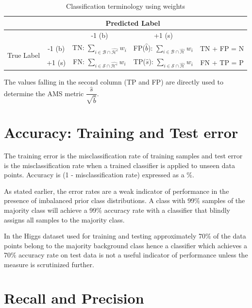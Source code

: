 \begin{table}[H]
\begin{center}
\begin{tabular}{c|c|c|c|c}
& & \multicolumn{2}{c}{Predicted Label}\\
\hline
& & -1 (b) & +1 (s) \\
\hline
\multirow{3}{*}{True Label} & -1 (b) & TN: $\sum_{i \in \mathcal{B} \cap \hat{\mathcal{H}^{c}}} w_{i}$  & FP($\hat{b}$): $\sum_{i \in \mathcal{B} \cap \hat{\mathcal{H}}} w_{i}$  & TN + FP = N\\ 
& +1 (s) & FN: $\sum_{i \in \mathcal{S} \cap \hat{\mathcal{H}^{c}}} w_{i}$ & TP($\hat{s}$): $\sum_{i \in \mathcal{S} \cap \hat{\mathcal{H}}} w_{i}$ & FN + TP = P\\ 
\hline 
\end{tabular}
\label{confusion_weights}
\caption{Classification terminology using weights}
\end{center}
\end{table}

The values falling in the second column (TP and FP) are directly used to determine the AMS metric $\dfrac{\hat{s}}{\sqrt{\hat{b}}}$.

\section{Accuracy: Training and Test error}

The training error is the misclassification rate of training samples and test error is the misclassification rate when a trained classifier is applied to unseen data points. Accuracy is (1 - misclassification rate) expressed as a $\%$.

As stated earlier, the error rates are a weak indicator of performance in the presence of imbalanced prior class distributions. A class with 99$\%$ samples of the majority class will achieve a 99$\%$ accuracy rate with a classifier that blindly assigns all samples to the majority class. 

In the Higgs dataset used for training and testing approximately 70$\%$ of the data points belong to the majority background class hence a classifier which achieves a 70$\%$ accuracy rate on test data is not a useful indicator of performance unless the measure is scrutinized further. 

\section{Recall and Precision}

